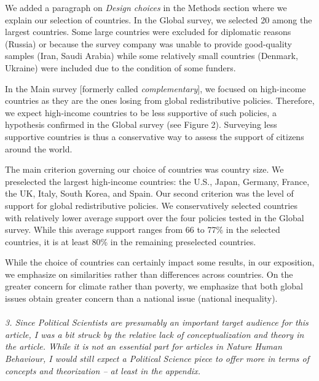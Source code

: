 \documentclass[12pt,english]{article}
\begin{document}
We added a paragraph on \textit{Design choices} in the Methods section where we explain our selection of countries. In the Global survey, we selected 20 among the largest countries. Some large countries were excluded for diplomatic reasons (Russia) or because the survey company was unable to provide good-quality samples (Iran, Saudi Arabia) while some relatively small countries (Denmark, Ukraine) were included due to the condition of some funders.

In the Main survey [formerly called \textit{complementary}], we focused on high-income countries as they are the ones losing from global redistributive policies. Therefore, we expect high-income countries to be less supportive of such policies, a hypothesis confirmed in the Global survey (see Figure 2). Surveying less supportive countries is thus a conservative way to assess the support of citizens around the world. 

The main criterion governing our choice of countries was country size. We preselected the largest high-income countries: the U.S., Japan, Germany, France, the UK, Italy, South Korea, and Spain. Our second criterion was the level of support for global redistributive policies. We conservatively selected countries with relatively lower average support over the four policies tested in the Global survey. While this average support ranges from 66 to 77\% in the selected countries, it is at least 80\% in the remaining preselected countries.

While the choice of countries can certainly impact some results, in our exposition, we emphasize on similarities rather than differences across countries. On the greater concern for climate rather than poverty, we emphasize that both global issues obtain greater concern than a national issue (national inequality). 
~\\ ~\\

\textit{3. Since Political Scientists are presumably an important target audience for this article, I was a bit struck by the relative lack of conceptualization and theory in the article. While it is not an essential part for articles in Nature Human Behaviour, I would still expect a Political Science piece to offer more in terms of concepts and theorization – at least in the appendix.}~\\
\end{document}
